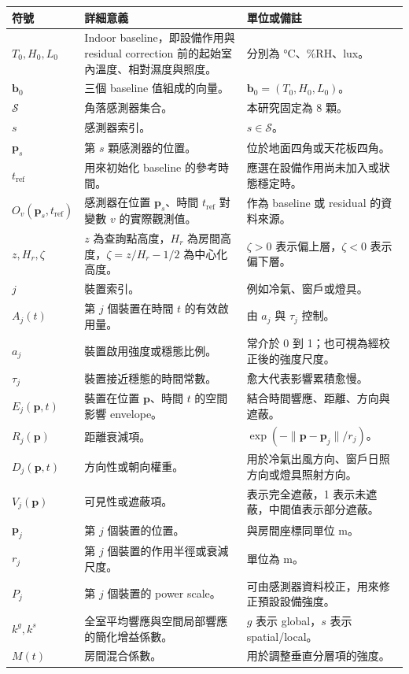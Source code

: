 \documentclass[12pt,a4paper]{article}
\begin{document}
\begin{table}[htbp]
\centering
\footnotesize
\renewcommand{\arraystretch}{1.25}
\begin{tabular}{|>{\raggedright\arraybackslash}p{}|>{\raggedright\arraybackslash}p{}|>{\raggedright\arraybackslash}p{}|}
\hline
\textbf{符號} & \textbf{詳細意義} & \textbf{單位或備註} \\
\hline
$T_0,H_0,L_0$ & Indoor baseline，即設備作用與 residual correction 前的起始室內溫度、相對濕度與照度。 & 分別為 °C、\%RH、lux。 \\
\hline
$\mathbf{b}_0$ & 三個 baseline 值組成的向量。 & $\mathbf{b}_0=(T_0,H_0,L_0)$。 \\
\hline
$\mathcal{S}$ & 角落感測器集合。 & 本研究固定為 8 顆。 \\
\hline
$s$ & 感測器索引。 & $s\in\mathcal{S}$。 \\
\hline
$\mathbf{p}_s$ & 第 $s$ 顆感測器的位置。 & 位於地面四角或天花板四角。 \\
\hline
$t_{\mathrm{ref}}$ & 用來初始化 baseline 的參考時間。 & 應選在設備作用尚未加入或狀態穩定時。 \\
\hline
$O_v(\mathbf{p}_s,t_{\mathrm{ref}})$ & 感測器在位置 $\mathbf{p}_s$、時間 $t_{\mathrm{ref}}$ 對變數 $v$ 的實際觀測值。 & 作為 baseline 或 residual 的資料來源。 \\
\hline
$z,H_r,\zeta$ & $z$ 為查詢點高度，$H_r$ 為房間高度，$\zeta=z/H_r-1/2$ 為中心化高度。 & $\zeta>0$ 表示偏上層，$\zeta<0$ 表示偏下層。 \\
\hline
$j$ & 裝置索引。 & 例如冷氣、窗戶或燈具。 \\
\hline
$A_j(t)$ & 第 $j$ 個裝置在時間 $t$ 的有效啟用量。 & 由 $a_j$ 與 $\tau_j$ 控制。 \\
\hline
$a_j$ & 裝置啟用強度或穩態比例。 & 常介於 0 到 1；也可視為經校正後的強度尺度。 \\
\hline
$\tau_j$ & 裝置接近穩態的時間常數。 & 愈大代表影響累積愈慢。 \\
\hline
$E_j(\mathbf{p},t)$ & 裝置在位置 $\mathbf{p}$、時間 $t$ 的空間影響 envelope。 & 結合時間響應、距離、方向與遮蔽。 \\
\hline
$R_j(\mathbf{p})$ & 距離衰減項。 & $\exp(-\|\mathbf{p}-\mathbf{p}_j\|/r_j)$。 \\
\hline
$D_j(\mathbf{p},t)$ & 方向性或朝向權重。 & 用於冷氣出風方向、窗戶日照方向或燈具照射方向。 \\
\hline
$V_j(\mathbf{p})$ & 可見性或遮蔽項。 & 0 表示完全遮蔽，1 表示未遮蔽，中間值表示部分遮蔽。 \\
\hline
$\mathbf{p}_j$ & 第 $j$ 個裝置的位置。 & 與房間座標同單位 m。 \\
\hline
$r_j$ & 第 $j$ 個裝置的作用半徑或衰減尺度。 & 單位為 m。 \\
\hline
$P_j$ & 第 $j$ 個裝置的 power scale。 & 可由感測器資料校正，用來修正預設設備強度。 \\
\hline
$k^{g},k^{s}$ & 全室平均響應與空間局部響應的簡化增益係數。 & $g$ 表示 global，$s$ 表示 spatial/local。 \\
\hline
$M(t)$ & 房間混合係數。 & 用於調整垂直分層項的強度。 \\
\hline
\end{tabular}
\end{table}
\end{document}
